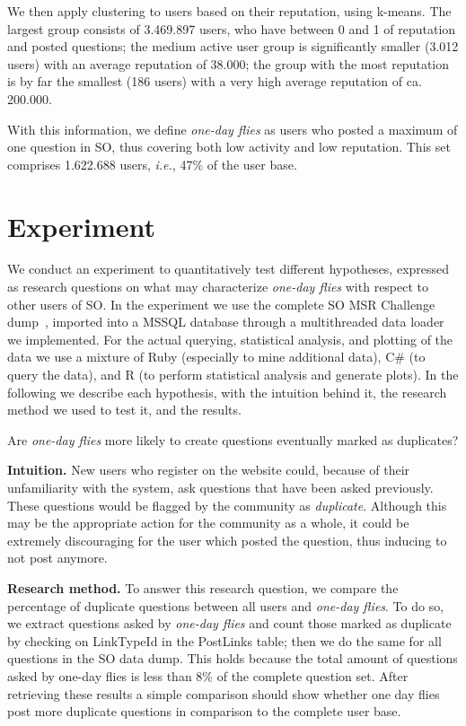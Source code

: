 \documentclass[conference]{IEEEtran}
\newcommand{\ie}{\emph{i.e.},\xspace}
\newcommand\odf{\emph{one-day flies}\xspace}
\begin{document}
We then apply clustering to users based on their reputation, using k-means.
The largest group consists of 3.469.897 users, who have between 0 and 1 of
reputation and posted questions; the medium active user group is significantly
smaller (3.012 users) with an average reputation of 38.000;  the group with the
most reputation is by far the smallest (186 users) with a very high average
reputation of ca. 200.000.

With this information, we define \odf as users who posted a maximum of one
question in SO, thus covering both low activity and low reputation. This set
comprises 1.622.688 users, \ie 47\% of the user base. 



\section{Experiment}

We conduct an experiment to quantitatively test different hypotheses, expressed
as research questions on what may characterize \odf with respect to other users
of SO. In the experiment we use the complete SO MSR Challenge
dump~\cite{MSRChallenge2015}, imported into a MSSQL database through a
multithreaded data loader we implemented.  For the actual querying, statistical
analysis, and plotting of the data we use a mixture of Ruby (especially to mine
additional data), C\# (to query the data), and R (to perform statistical
analysis and generate plots).  In the following we describe each hypothesis,
with the intuition behind it, the research method we used to test it, and the
results.\\

\begin{tcolorbox}[size=fbox,title=RQ1: Duplicate Questions]
Are \odf more likely to create questions eventually marked as duplicates?
\end{tcolorbox}

\textbf{Intuition.} New users who register on
the website could, because of their unfamiliarity with the system, ask
questions that have been asked previously. These questions would be flagged
by the community as \textit{duplicate}. Although this may be the appropriate
action for the community as a whole, it could be extremely discouraging for the
user which posted the question, thus inducing to not post anymore. 

\textbf{Research method.} To answer this research question, we compare the
percentage of duplicate questions  between all users and \odf. To do so, we
extract questions asked by \odf and count those marked as duplicate by checking
on  LinkTypeId in the PostLinks table; then we do the same for all questions in
the SO data dump. This holds because the total amount of questions asked by
one-day flies is less than $8\%$ of the complete question set. After retrieving
these results a simple comparison should show whether one day flies post more
duplicate questions in comparison to the complete user base.
\end{document}
